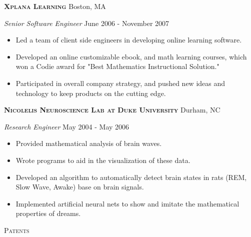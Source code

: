 \documentclass[a4paper]{article}
\newcommand{\lineunder} {
    \vspace*{-8pt} \\
    \hspace*{-18pt} \hrulefill \\
}
\newcommand{\header} [1] {
    {\hspace*{-18pt}\vspace*{6pt} \textsc{#1}}
    \vspace*{-6pt} \lineunder
    \vspace{2mm}
}
\begin{document}
\textbf{\textsc{Xplana Learning}} \hfill Boston, MA\\
\vspace{2mm}

\begin{addmargin}[1em]{0em}

\textit{Senior Software Engineer} \hfill June 2006 - November 2007\\
\vspace{-1mm}
\begin{itemize} \itemsep 1pt
    \item Led a team of client side engineers in developing online learning software.
    \item Developed an online customizable ebook, and math learning courses, which 
        won a Codie award for "Best Mathematics Instructional Solution."
    \item Participated in overall company strategy, and pushed new ideas and technology 
        to keep products on the cutting edge.
\end{itemize}

\end{addmargin}

\textbf{\textsc{Nicolelis Neuroscience Lab at Duke University}} \hfill Durham, NC\\
\vspace{2mm}

\begin{addmargin}[1em]{0em}

\textit{Research Engineer} \hfill May 2004 - May 2006\\
\vspace{-1mm}
\begin{itemize} \itemsep 1pt
    \item Provided mathematical analysis of brain waves.
    \item Wrote programs to aid in the visualization of these data.
    \item Developed an algorithm to automatically detect brain states 
        in rats (REM, Slow Wave, Awake) base on brain signals.
    \item Implemented artificial neural nets to show and imitate the 
        mathematical properties of dreams.

\end{itemize}

\end{addmargin}

\header{Patents}
\end{document}
